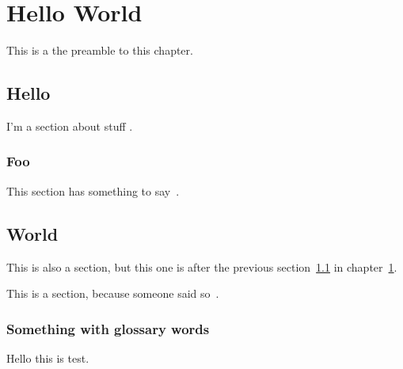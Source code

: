 \chapter{Hello World}\label{sec:hello-world}

This is a the preamble to this chapter.

\section{Hello}\label{sec:hello}

I'm a section about stuff \cite{dummy:1}.

\subsection{Foo}

This section has something to say~\cite{johndoe2014}.

\section{World}

This is also a section, but this one is after the previous section~\ref{sec:hello} in chapter~\ref{sec:hello-world}.

This is a section, because someone said so~\cite{rubow2000a}.

\subsection{Something with glossary words}

Hello this is \gls{test}.
